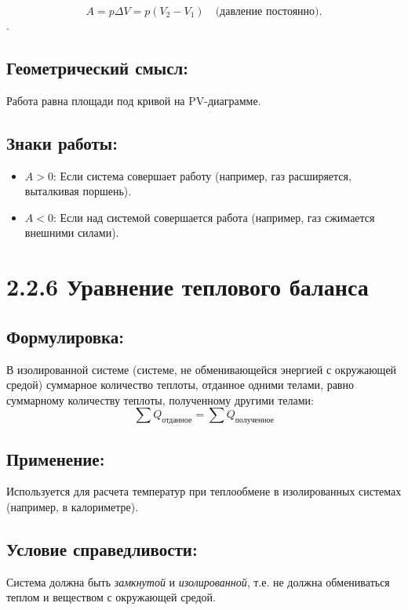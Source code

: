 \documentclass[a4paper,12pt]{article}
\begin{document}
$$ A = p \Delta V = p(V_2 - V_1) \quad \text{(давление постоянно).} $$.


\vspace{-9pt}
\subsection*{Геометрический смысл:}
\vspace{-3pt}
Работа равна площади под кривой на PV-диаграмме.

\vspace{-9pt}
\subsection*{Знаки работы:}
\vspace{-3pt}
\begin{itemize}
    \item $A > 0$: Если система совершает работу (например, газ расширяется, выталкивая поршень).
    \item $A < 0$: Если над системой совершается работа (например, газ сжимается внешними силами).
\end{itemize}


\section*{2.2.6 Уравнение теплового баланса}
\vspace{-9pt}
\subsection*{Формулировка:}
\vspace{-3pt}
В изолированной системе (системе, не обменивающейся энергией с окружающей средой) суммарное количество теплоты, отданное одними телами, равно суммарному количеству теплоты, полученному другими телами:
\vspace{-0.05em}
$$ \sum{Q_{\text{отданное}}} = \sum{Q_{\text{полученное}}} $$

\vspace{-9pt}
\subsection*{Применение:}
\vspace{-3pt}
Используется для расчета температур при теплообмене в изолированных системах (например, в калориметре).
\newpage
\vspace{-9pt}
\subsection*{Условие справедливости:}
\vspace{-3pt}
Система должна быть \textit{замкнутой} и \textit{изолированной}, т.е. не должна обмениваться теплом и веществом с окружающей средой.
\end{document}
